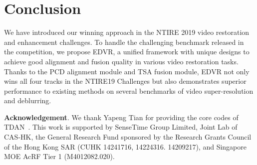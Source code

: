 \documentclass[10pt,twocolumn,letterpaper]{article}
\begin{document}
\section{Conclusion}
We have introduced our winning approach in the NTIRE 2019 video restoration and enhancement challenges. To handle the challenging benchmark released in the competition, we propose EDVR, a unified framework with unique designs to achieve good alignment and fusion quality in various video restoration tasks.
Thanks to the PCD alignment module and TSA fusion module, EDVR not only wins all four tracks in the NTIRE19 Challenges but also demonstrates superior performance to existing methods on several benchmarks of video super-resolution and deblurring.

\vspace{0.2cm}
\normalsize{
	\noindent\textbf{Acknowledgement}.
	We thank Yapeng Tian for providing the core codes of TDAN~\cite{tian2018tdan}.
	This work is supported by SenseTime Group Limited, Joint Lab of CAS-HK, the General Research Fund sponsored by the Research Grants Council of the Hong Kong SAR (CUHK 14241716, 14224316. 14209217), and Singapore MOE AcRF Tier 1 (M4012082.020).
}
\clearpage
\clearpage
{\small


}
\end{document}
